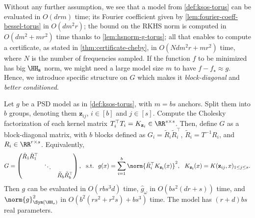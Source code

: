 \documentclass{article}
\begin{document}
Without any further assumption, we see that a model from \cref{def:ksos-torus} can be evaluated in $O(drm)$ time; its Fourier coefficient given by \cref{lem:fourier-coeff-bessel-torus} in $O(d m^2 r)$; the bound on the RKHS norm is computed in $O(d m^2 + m r^2)$ time thanks to \cref{lem:hsnorm-g-torus}; all that enables to compute a certificate, as stated in \cref{thm:certificate-cheby}, in $O(N d m^2 r + m r^2)$ time, where $N$ is the number of frequencies sampled. If the function $f$ to be minimized has big $\HH_\mathbf{s}$ norm, we might need a large model size $m$ to have $f - f_\star \approx g$. Hence, we introduce specific structure on $G$ which makes it \emph{block-diagonal} and \emph{better conditioned}.

\begin{proposition}\label{prop:bettermodels-blockdiag}
  Let $g$ be a PSD model as in \cref{def:ksos-torus}, with $m = bs$ anchors. Split them into $b$ groups, denoting them $\mathbf{z}_{ij}$, $i \in [b]$ and $j \in [s]$. Compute the Cholesky factorization of each kernel matrix $T_i^\top T_i = K_{\mathbf{z}_i} \in \RR^{s \times s}$. Then, define $G$ as a block-diagonal matrix, with $b$ blocks defined as $G_i = \tilde{R}_i \tilde{R}_i^\top$,  $\tilde{R}_i = T^{-1} R_i$, and $R_i \in \RR^{r \times s}$. Equivalently,
  \begin{equation}
    G = \begin{pmatrix}
      \tilde{R}_1 \tilde{R}_1^\top &        &                              \\
                                   & \ddots &                              \\
                                   &        & \tilde{R}_b \tilde{R}_b^\top
    \end{pmatrix},
    ~~\text{s.t.}~~
    g(x) = \sum_{i = 1}^b \norm{\tilde{R}_i^\top K_{\mathbf{z_i}}(x)}^2,
    ~~
    K_{\mathbf{z_i}}(x) = K(\mathbf{z}_{ij}, x)_{1 \leq j \leq s}.
  \end{equation}
  Then $g$ can be evaluated in $O(r b s^3 d)$ time, $\hat{g}_\omega$ in $O(b s^2 (d r + s))$ time, and $\norm{g}_{\Sym(\HH_s)}^2$ in $O(b^2 (r s^2 + r^2 s) + bs^3)$ time. The model has $(r+d)bs$ real parameters.
\end{proposition}
\end{document}
